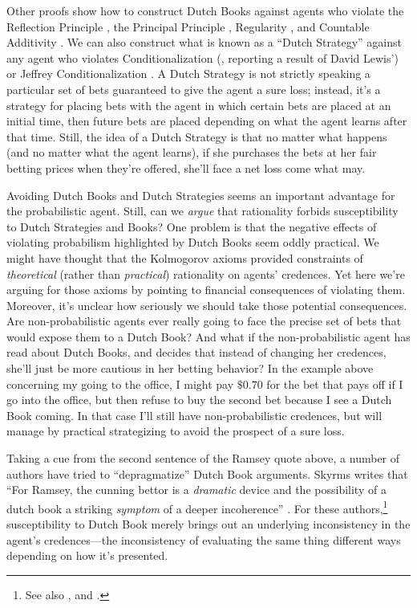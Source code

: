 Other proofs show how to construct Dutch Books against agents who violate the Reflection Principle \citep{vanFraassenWill}, the Principal Principle \citep{HowsonDutch}, Regularity \citep{KemenyFairBets,ShimonyAxioms}, and Countable Additivity \citep{AdamsRational}. We can also construct what is known as a ``Dutch Strategy'' against any agent who violates Conditionalization (\citealp{TellerCondObs}, reporting a result of David Lewis') or Jeffrey Conditionalization \citep{ArmendtKinematics,SkyrmsDynamic}. A Dutch Strategy is not strictly speaking a particular set of bets guaranteed to give the agent a sure loss; instead, it's a strategy for placing bets with the agent in which certain bets are placed at an initial time, then future bets are placed depending on what the agent learns after that time. Still, the idea of a Dutch Strategy is that no matter what happens (and no matter what the agent learns), if she purchases the bets at her fair betting prices when they're offered, she'll face a net loss come what may.

Avoiding Dutch Books and Dutch Strategies seems an important advantage for the probabilistic agent. Still, can we \emph{argue} that rationality forbids susceptibility to Dutch Strategies and Books? One problem is that the negative effects of violating probabilism highlighted by Dutch Books seem oddly practical. We might have thought that the Kolmogorov axioms provided constraints of \emph{theoretical} (rather than \emph{practical}) rationality on agents' credences. Yet here we're arguing for those axioms by pointing to financial consequences of violating them. Moreover, it's unclear how seriously we should take those potential consequences. Are non-probabilistic agents ever really going to face the precise set of bets that would expose them to a Dutch Book? And what if the non-probabilistic agent has read about Dutch Books, and decides that instead of changing her credences, she'll just be more cautious in her betting behavior?  In the example above concerning my going to the office, I might pay $\$0.70$ for the bet that pays off if I go into the office, but then refuse to buy the second bet because I see a Dutch Book coming. In that case I'll still have non-probabilistic credences, but will manage by practical strategizing to avoid the prospect of a sure loss.

Taking a cue from the second sentence of the Ramsey quote above, a number of authors have tried to ``depragmatize'' Dutch Book arguments. Skyrms writes that ``For Ramsey, the cunning bettor is a \emph{dramatic} device and the possibility of a dutch book a striking \emph{symptom} of a deeper incoherence'' \citep[p.\ 227, emphases mine]{SkyrmsCoherence}. For these authors,\footnote
{See also \citet{ArmendtDutch,ChristensenPlace}, and \citet{HowsonUrbach}.
} susceptibility to Dutch Book merely brings out an underlying inconsistency in the agent's credences---the inconsistency of evaluating the same thing different ways depending on how it's presented.

